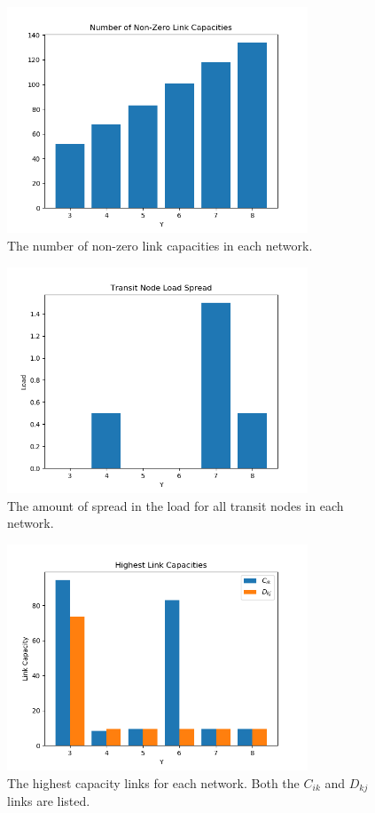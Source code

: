 \documentclass[12pt]{article} %
\begin{document}
\begin{figure}[H]
	\centering
	\includegraphics[width=0.8\textwidth]{cplex_data_num_nonzero_links}
	\caption{The number of non-zero link capacities in each network.}
	\label{fig:cplex_num_nonzero_links}
\end{figure}

\begin{figure}[H]
	\centering
	\includegraphics[width=0.8\textwidth]{cplex_data_transit_load_spread}
	\caption{The amount of spread in the load for all transit nodes in each network.}
	\label{fig:cplex_transit_load_spread}
\end{figure}

\begin{figure}[H]
	\centering
	\includegraphics[width=0.8\textwidth]{cplex_data_highest_capacity_links}
	\caption{The highest capacity links for each network. Both the $C_{ik}$ and $D_{kj}$ links are listed.}
	\label{fig:cplex_highest_capacity_links}
\end{figure}
\end{document}
